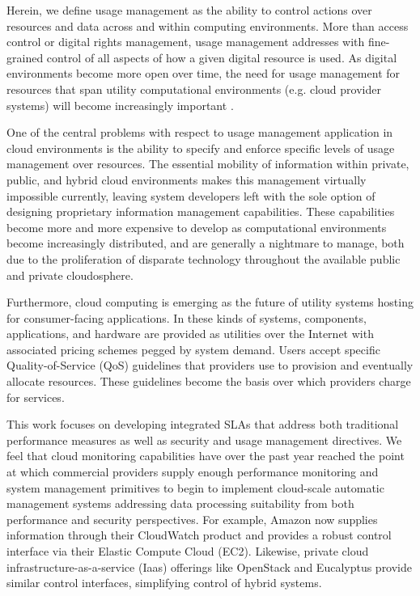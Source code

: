 \documentclass{acm_proc_article-sp}
\begin{document}
Herein, we define usage management as the ability to control actions over resources and data across and within computing environments.  More than access control or digital rights management, usage management addresses with fine-grained control of all aspects of how a given digital resource is used.  As digital environments become more open over time, the need for usage management for resources that span utility computational environments (e.g. cloud provider systems) will become increasingly important \cite{ctrl:lamb-MCCCS,ctrl:lamb-SOSE}.

One of the central problems with respect to usage management application in cloud environments is the ability to specify and enforce specific levels of usage management over resources.  The essential mobility of information within private, public, and hybrid cloud environments makes this management virtually impossible currently, leaving system developers left with the sole option of designing proprietary information management capabilities.  These capabilities become more and more expensive to develop as computational environments become increasingly distributed, and are generally a nightmare to manage, both due to the proliferation of disparate technology throughout the available public and private cloudosphere. 

Furthermore, cloud computing is emerging as the future of utility systems hosting for consumer-facing applications.  In these kinds of systems, components, applications, and hardware are provided as utilities over the Internet with associated pricing schemes pegged by system demand.  Users accept specific Quality-of-Service (QoS) guidelines that providers use to provision and eventually allocate resources. These guidelines become the basis over which providers charge for services. 

This work focuses on developing integrated SLAs that address both traditional performance measures as well as security and usage management directives.  We feel that cloud monitoring capabilities have over the past year reached the point at which commercial providers supply enough performance monitoring and system management primitives to begin to implement cloud-scale automatic management systems addressing data processing suitability from both performance and security perspectives.  For example, Amazon now supplies information through their CloudWatch product and provides a robust control interface via their Elastic Compute Cloud (EC2).  Likewise, private cloud infrastructure-as-a-service (Iaas) offerings like OpenStack and Eucalyptus provide similar control interfaces, simplifying control of hybrid systems.
\end{document}
